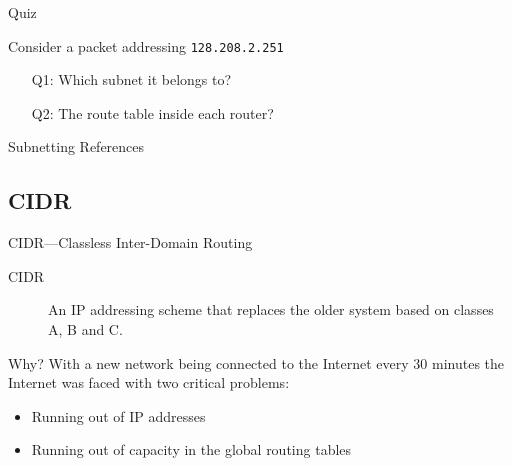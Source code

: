 \begin{frame}{Quiz}
  \begin{center}
  \end{center}
  Consider a packet addressing \texttt{128.208.2.251}
  \begin{itemize}
  \item[Q1:] Which subnet it belongs to?
  \item[Q2:] The route table inside each router?
  \end{itemize}
\end{frame}

\begin{frame}{Subnetting References}
  \begin{refsection}
    \nocite{wiki:subnet, wiki:ipv4subnetref,wiki:privatenet,rfc917,rfc950}
    \printbibliography[heading=none]
  \end{refsection}
\end{frame}

\subsection{CIDR}

\begin{frame}{CIDR---Classless Inter-Domain Routing}
  \begin{description}
  \item[CIDR] An IP addressing scheme that replaces the older system
    based on classes A, B and C.
  \end{description}
  \begin{iblock}{Why?}
    With a new network being connected to the Internet every 30 minutes the Internet was
    faced with two critical problems:
    \begin{itemize}
    \item Running out of IP addresses
    \item Running out of capacity in the global routing tables
    \end{itemize}
  \end{iblock}
\end{frame}

